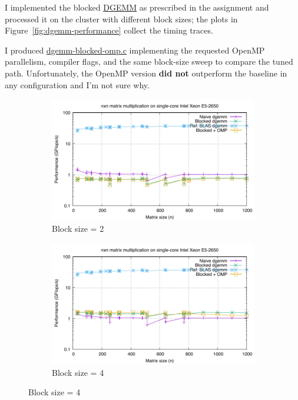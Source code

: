

I implemented the blocked \href{./../src/3-Optimize-Matrix-Matrix-Mult/dgemm-blocked.c}{DGEMM} as prescribed in the assignment and processed it on the cluster with different block sizes; the plots in Figure~\ref{fig:dgemm-performance} collect the timing traces.

I produced \href{./../src/3-Optimize-Matrix-Matrix-Mult/dgemm-blocked-omp.c}{dgemm-blocked-omp.c} implementing the requested OpenMP parallelism, compiler flags, and the same block-size sweep to compare the tuned path. Unfortunately, the OpenMP version \textbf{did not} outperform the baseline in any configuration and I'm not sure why.

\begin{figure}[H]
    \centering
    \begin{subfigure}[b]{0.48\textwidth}
        \centering
        \includegraphics[width=\textwidth]{../src/3-Optimize-Matrix-Matrix-Mult/results/timing-02.pdf}
        \caption{Block size = 2}
        \label{fig:timing-02}
    \end{subfigure}
    \hfill
    \begin{subfigure}[b]{0.48\textwidth}
        \centering
        \includegraphics[width=\textwidth]{../src/3-Optimize-Matrix-Matrix-Mult/results/timing-04.pdf}
        \caption{Block size = 4}
        \label{fig:timing-04}
    \end{subfigure}
    

\end{figure}

